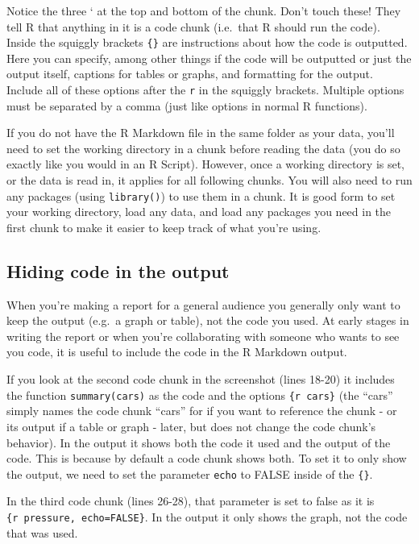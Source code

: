 \documentclass[
]{krantz}
\begin{document}
Notice the three ` at the top and bottom of the chunk. Don't touch these! They tell R that anything in it is a code chunk (i.e.~that R should run the code). Inside the squiggly brackets \texttt{\{\}} are instructions about how the code is outputted. Here you can specify, among other things if the code will be outputted or just the output itself, captions for tables or graphs, and formatting for the output. Include all of these options after the \texttt{r} in the squiggly brackets. Multiple options must be separated by a comma (just like options in normal R functions).

If you do not have the R Markdown file in the same folder as your data, you'll need to set the working directory in a chunk before reading the data (you do so exactly like you would in an R Script). However, once a working directory is set, or the data is read in, it applies for all following chunks. You will also need to run any packages (using \texttt{library()}) to use them in a chunk. It is good form to set your working directory, load any data, and load any packages you need in the first chunk to make it easier to keep track of what you're using.

\hypertarget{hiding-code-in-the-output}{%
\subsection{Hiding code in the output}\label{hiding-code-in-the-output}}

When you're making a report for a general audience you generally only want to keep the output (e.g.~a graph or table), not the code you used. At early stages in writing the report or when you're collaborating with someone who wants to see you code, it is useful to include the code in the R Markdown output.

If you look at the second code chunk in the screenshot (lines 18-20) it includes the function \texttt{summary(cars)} as the code and the options \texttt{\{r\ cars\}} (the ``cars'' simply names the code chunk ``cars'' for if you want to reference the chunk - or its output if a table or graph - later, but does not change the code chunk's behavior). In the output it shows both the code it used and the output of the code. This is because by default a code chunk shows both. To set it to only show the output, we need to set the parameter \texttt{echo} to FALSE inside of the \texttt{\{\}}.

In the third code chunk (lines 26-28), that parameter is set to false as it is \texttt{\{r\ pressure,\ echo=FALSE\}}. In the output it only shows the graph, not the code that was used.
\end{document}

